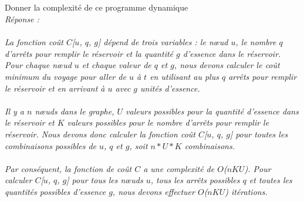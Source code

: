 \documentclass[a4paper,11pt]{article}
\begin{document}
        \subsection{}\label{subsec:Q6}
        Donner la complexité de ce programme dynamique
            \\\textit{Réponse : \\\\        
La fonction coût $C$[$u$, $q$, $g$] dépend de trois variables : le nœud $u$, le nombre $q$ d'arrêts pour remplir le réservoir et la quantité $g$ d'essence dans le réservoir. Pour chaque nœud $u$ et chaque valeur de $q$ et $g$, nous devons calculer le coût minimum du voyage pour aller de $u$ à $t$ en utilisant au plus $q$ arrêts pour remplir le réservoir et en arrivant à $u$ avec $g$ unités d'essence.\\\\
Il y a $n$ nœuds dans le graphe, $U$ valeurs possibles pour la quantité d'essence dans le réservoir et $K$ valeurs possibles pour le nombre d'arrêts pour remplir le réservoir. Nous devons donc calculer la fonction coût $C$[$u$, $q$, $g$] pour toutes les combinaisons possibles de $u$, $q$ et $g$, soit $n * U * K$ combinaisons.\\\\
Par conséquent, la fonction de coût $C$ a une complexité de $O$($nKU$). Pour calculer $C$[$u$, $q$, $g$] pour tous les nœuds $u$, tous les arrêts possibles $q$ et toutes les quantités possibles d'essence $g$, nous devons effectuer $O$($nKU$) itérations.\\\\}
\end{document}
